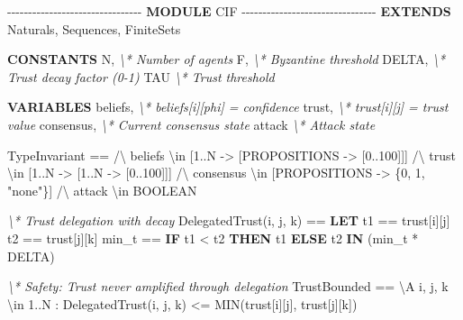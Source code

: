 \documentclass[
]{article}
\newenvironment{Shaded}{}{}
\newcommand{\CommentTok}[1]{\textcolor[rgb]{0.38,0.63,0.69}{\textit{#1}}}
\newcommand{\DecValTok}[1]{\textcolor[rgb]{0.25,0.63,0.44}{#1}}
\newcommand{\KeywordTok}[1]{\textcolor[rgb]{0.00,0.44,0.13}{\textbf{#1}}}
\newcommand{\NormalTok}[1]{#1}
\newcommand{\StringTok}[1]{\textcolor[rgb]{0.25,0.44,0.63}{#1}}
\newcounter{none} %
\begin{document}
\begin{Shaded}
\begin{Highlighting}[]
\NormalTok{{-}{-}{-}{-}{-}{-}{-}{-}{-}{-}{-}{-}{-}{-}{-}{-}{-}{-}{-}{-}{-}{-}{-}{-}{-}{-}{-}{-}{-}{-}{-}{-} }\KeywordTok{MODULE}\NormalTok{ CIF {-}{-}{-}{-}{-}{-}{-}{-}{-}{-}{-}{-}{-}{-}{-}{-}{-}{-}{-}{-}{-}{-}{-}{-}{-}{-}{-}{-}{-}{-}{-}{-}}
\KeywordTok{EXTENDS}\NormalTok{ Naturals, Sequences, FiniteSets}

\KeywordTok{CONSTANTS}\NormalTok{ N,           }\CommentTok{\textbackslash{}* Number of agents}
\NormalTok{          F,           }\CommentTok{\textbackslash{}* Byzantine threshold}
\NormalTok{          DELTA,       }\CommentTok{\textbackslash{}* Trust decay factor (0{-}1)}
\NormalTok{          TAU          }\CommentTok{\textbackslash{}* Trust threshold}

\KeywordTok{VARIABLES}\NormalTok{ beliefs,     }\CommentTok{\textbackslash{}* beliefs[i][phi] = confidence}
\NormalTok{          trust,       }\CommentTok{\textbackslash{}* trust[i][j] = trust value}
\NormalTok{          consensus,   }\CommentTok{\textbackslash{}* Current consensus state}
\NormalTok{          attack       }\CommentTok{\textbackslash{}* Attack state}

\NormalTok{TypeInvariant ==}
\NormalTok{  /\textbackslash{} beliefs \textbackslash{}in [}\DecValTok{1}\NormalTok{..N {-}\textgreater{} [PROPOSITIONS {-}\textgreater{} [}\DecValTok{0}\NormalTok{..}\DecValTok{100}\NormalTok{]]]}
\NormalTok{  /\textbackslash{} trust \textbackslash{}in [}\DecValTok{1}\NormalTok{..N {-}\textgreater{} [}\DecValTok{1}\NormalTok{..N {-}\textgreater{} [}\DecValTok{0}\NormalTok{..}\DecValTok{100}\NormalTok{]]]}
\NormalTok{  /\textbackslash{} consensus \textbackslash{}in [PROPOSITIONS {-}\textgreater{} \{}\DecValTok{0}\NormalTok{, }\DecValTok{1}\NormalTok{, }\StringTok{"none"}\NormalTok{\}]}
\NormalTok{  /\textbackslash{} attack \textbackslash{}in BOOLEAN}

\CommentTok{\textbackslash{}* Trust delegation with decay}
\NormalTok{DelegatedTrust(i, j, k) ==}
  \KeywordTok{LET}\NormalTok{ t1 == trust[i][j]}
\NormalTok{      t2 == trust[j][k]}
\NormalTok{      min\_t == }\KeywordTok{IF}\NormalTok{ t1 \textless{} t2 }\KeywordTok{THEN}\NormalTok{ t1 }\KeywordTok{ELSE}\NormalTok{ t2}
  \KeywordTok{IN}\NormalTok{ (min\_t * DELTA)}

\CommentTok{\textbackslash{}* Safety: Trust never amplified through delegation}
\NormalTok{TrustBounded ==}
\NormalTok{  \textbackslash{}A i, j, k \textbackslash{}in }\DecValTok{1}\NormalTok{..N :}
\NormalTok{    DelegatedTrust(i, j, k) \textless{}= MIN(trust[i][j], trust[j][k])}


\end{Highlighting}
\end{Shaded}
\end{document}
